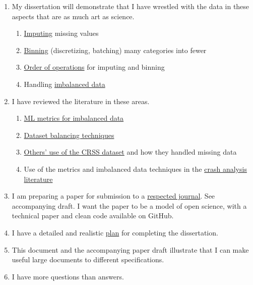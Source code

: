 \begin{enumerate}
	\item My dissertation will demonstrate that I have wrestled with the data in these aspects that are as much art as science.
	\begin{enumerate}[label=\alph*., partopsep=0pt,topsep=0pt,parsep=0pt]
		\item \hyperref[sec:CRSS_Imputing]{Imputing} missing values
		\item \hyperref[sec:CRSS_Binning]{Binning} (discretizing, batching) many categories into fewer
		\item \hyperref[sec:CRSS_Order_of_Operations]{Order of operations} for imputing and binning
		\item Handling \hyperref[sec:Focal_Loss_and_Tomek]{imbalanced data}
	\end{enumerate}
	
	\item I have reviewed the literature in these areas.
	\begin{enumerate}[label=\alph*., partopsep=0pt,topsep=0pt,parsep=0pt]
		\item \hyperref[sec:Imbalanced_Metrics]{ML metrics for imbalanced data}
		\item \hyperref[sec:Lit_Review_Imbalanced]{Dataset balancing techniques}
		\item \hyperref[sec:CRSS_Literature]{Others' use of the CRSS dataset} and how they handled missing data
		\item Use of the metrics and imbalanced data techniques in the \hyperref[sec:Crash_Imbalanced_Papers]{crash analysis literature}
	\end{enumerate}
	
	\item I am preparing a paper for submission to a 
	\hyperref[sec:Journals]{respected journal}.  See accompanying draft.  I want the paper to be a model of open science, with a technical paper and clean code available on GitHub.
	
	\item I have a detailed and realistic \hyperref[sec:Research_Plan]{plan}
	for completing the dissertation.  
	
	\item This document and the accompanying paper draft illustrate that I can make useful large documents to different specifications.  

	\item I have more questions than answers.  
\end{enumerate}